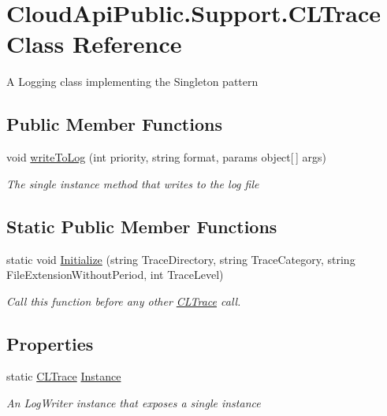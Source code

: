 \hypertarget{class_cloud_api_public_1_1_support_1_1_c_l_trace}{\section{Cloud\-Api\-Public.\-Support.\-C\-L\-Trace Class Reference}
\label{class_cloud_api_public_1_1_support_1_1_c_l_trace}
}


A Logging class implementing the Singleton pattern  


\subsection*{Public Member Functions}
\begin{DoxyCompactItemize}
\item 
void \hyperlink{class_cloud_api_public_1_1_support_1_1_c_l_trace_a48d83268eca0ea148c25094b3b343192}{write\-To\-Log} (int priority, string format, params object\mbox{[}$\,$\mbox{]} args)
\begin{DoxyCompactList}\small\item\em The single instance method that writes to the log file \end{DoxyCompactList}\end{DoxyCompactItemize}
\subsection*{Static Public Member Functions}
\begin{DoxyCompactItemize}
\item 
static void \hyperlink{class_cloud_api_public_1_1_support_1_1_c_l_trace_a01ee05e2bb4b135b85f6046209c1b55e}{Initialize} (string Trace\-Directory, string Trace\-Category, string File\-Extension\-Without\-Period, int Trace\-Level)
\begin{DoxyCompactList}\small\item\em Call this function before any other \hyperlink{class_cloud_api_public_1_1_support_1_1_c_l_trace}{C\-L\-Trace} call. \end{DoxyCompactList}\end{DoxyCompactItemize}
\subsection*{Properties}
\begin{DoxyCompactItemize}
\item 
static \hyperlink{class_cloud_api_public_1_1_support_1_1_c_l_trace}{C\-L\-Trace} \hyperlink{class_cloud_api_public_1_1_support_1_1_c_l_trace_a0861d3bda40d01c666acb82cef1cb595}{Instance}
\begin{DoxyCompactList}\small\item\em An Log\-Writer instance that exposes a single instance \end{DoxyCompactList}\end{DoxyCompactItemize}


